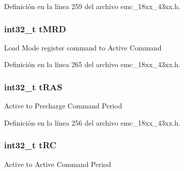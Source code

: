 Definición en la línea 259 del archivo emc\+\_\+18xx\+\_\+43xx.\+h.

\subsubsection[{\texorpdfstring{t\+M\+RD}{tMRD}}]{\setlength{\rightskip}{0pt plus 5cm}int32\+\_\+t t\+M\+RD}\hypertarget{struct_i_p___e_m_c___d_y_n___c_o_n_f_i_g___t_a245e7ecbfe89077532e110d02af2f901}{}\label{struct_i_p___e_m_c___d_y_n___c_o_n_f_i_g___t_a245e7ecbfe89077532e110d02af2f901}
Load Mode register command to Active Command 

Definición en la línea 265 del archivo emc\+\_\+18xx\+\_\+43xx.\+h.

\subsubsection[{\texorpdfstring{t\+R\+AS}{tRAS}}]{\setlength{\rightskip}{0pt plus 5cm}int32\+\_\+t t\+R\+AS}\hypertarget{struct_i_p___e_m_c___d_y_n___c_o_n_f_i_g___t_a27c345960642ecd5d952226b67716018}{}\label{struct_i_p___e_m_c___d_y_n___c_o_n_f_i_g___t_a27c345960642ecd5d952226b67716018}
Active to Precharge Command Period 

Definición en la línea 256 del archivo emc\+\_\+18xx\+\_\+43xx.\+h.

\subsubsection[{\texorpdfstring{t\+RC}{tRC}}]{\setlength{\rightskip}{0pt plus 5cm}int32\+\_\+t t\+RC}\hypertarget{struct_i_p___e_m_c___d_y_n___c_o_n_f_i_g___t_ae14468583bf6b934a846faca9f4ce71a}{}\label{struct_i_p___e_m_c___d_y_n___c_o_n_f_i_g___t_ae14468583bf6b934a846faca9f4ce71a}
Active to Active Command Period 

